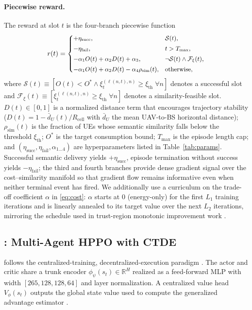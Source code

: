 \paragraph{Piecewise reward.} The reward at slot $t$ is the four-branch
piecewise function
\begin{equation}\small
r(t) =
\begin{cases}
+\eta_{\mathrm{succ}},
  & \mathcal{S}(t),\\[2pt]
-\eta_{\mathrm{fail}},
  & t>T_{\max},\\[2pt]
-\alpha_{1}O(t)+\alpha_{2}D(t)+\alpha_{3},
  & \neg\mathcal{S}(t)\wedge\mathcal{F}_{\xi}(t),\\[2pt]
-\alpha_{1}O(t)+\alpha_{2}D(t)-\alpha_{4}\rho_{\mathrm{sim}}(t),
  & \text{otherwise},
\end{cases}
\label{eq:reward}
\end{equation}
where $\mathcal{S}(t)\!\equiv\![O(t)\!<\!O^{*}\wedge\xi^{(\ell(n,t),n)}_{t}\!\ge\!\xi_{\mathrm{th}}\;\forall n]$
denotes a successful slot and $\mathcal{F}_{\xi}(t)\!\equiv\![\xi^{(\ell(n,t),n)}_{t}\!\ge\!\xi_{\mathrm{th}}\;\forall n]$
denotes a similarity-feasible slot.
$D(t)\in[0,1]$ is a normalized distance term that encourages
trajectory stability ($D(t)=1-\bar{d}_{U}(t)/R_{\mathrm{cell}}$ with
$\bar{d}_{U}$ the mean UAV-to-BS horizontal distance);
$\rho_{\mathrm{sim}}(t)$ is the fraction of UEs whose semantic
similarity falls below the threshold $\xi_{\mathrm{th}}$; $O^{*}$ is the
target consumption bound; $T_{\max}$ is the episode length cap; and
$(\eta_{\mathrm{succ}},\eta_{\mathrm{fail}},\alpha_{1\ldots4})$ are
hyperparameters listed in Table~\ref{tab:params}. Successful semantic
delivery yields $+\eta_{\mathrm{succ}}$, episode termination without
success yields $-\eta_{\mathrm{fail}}$; the third and fourth branches
provide dense gradient signal over the cost--similarity manifold so that
gradient flow remains informative even when neither terminal event has
fired. We additionally use a curriculum on the trade-off coefficient
$\alpha$ in \eqref{eq:cost}: $\alpha$ starts at $0$ (energy-only) for
the first $L_{1}$ training iterations and is linearly annealed to its
target value over the next $L_{2}$ iterations, mirroring the
schedule used in trust-region monotonic improvement work
\cite{schulman2015trpo,kuba2022happo}.

\subsection{\method: Multi-Agent HPPO with CTDE}\label{subsec:mahppo}
\method follows the centralized-training, decentralized-execution
paradigm \cite{lowe2017maddpg,yu2022mappo}. The actor and critic share a
trunk encoder $\phi_{\psi}(s_{t})\in\mathbb{R}^{H}$ realized as a
feed-forward MLP with width
$[265,128,128,64]$ and layer normalization. A centralized value head
$V_{\phi}(s_{t})$ outputs the global state value used to compute the
generalized advantage estimator
\cite{schulman2017ppo}.


